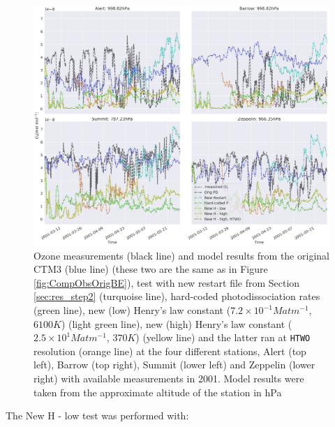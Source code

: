 \begin{figure}[ht]
    \centering
    \includegraphics[width=\linewidth]{Chapter6_Results/images/ozone_stationComp_2001/ozone_2001_step3.png}
    \caption{Ozone measurements (black line) and model results from the original CTM3 (blue line) (these two are the same as in Figure \ref{fig:CompObsOrigBE}), test with new restart file from Section \ref{sec:res_step2} (turquoise line), hard-coded photodissociation rates (green line), new (low) Henry's law constant ($7.2\times10^{-1} M atm ^{-1}$, $6100 K$) (light green line), new (high) Henry's law constant ($2.5\times10^{1} M atm ^{-1}$, $370 K$) (yellow line) and the latter ran at \texttt{HTWO} resolution (orange line) at the four different stations, Alert (top left), Barrow (top right), Summit (lower left) and Zeppelin (lower right) with available measurements in 2001. Model results were taken from the approximate altitude of the station in hPa \protect\footnotemark}
    \label{fig:ozone_2001_step3}
\end{figure}




The New H - low test was performed with: 




